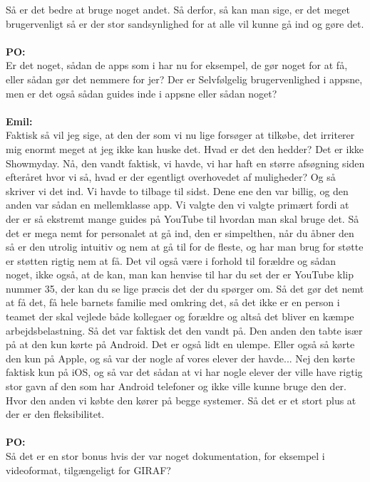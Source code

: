 Så er det bedre at bruge noget andet.
Så derfor, så kan man sige, er det meget brugervenligt så er der stor sandsynlighed for at alle vil kunne gå ind og gøre det.
\\\\
\textbf{PO:}\\
Er det noget, sådan de apps som i har nu for eksempel, de gør noget for at få, eller sådan gør det nemmere for jer?
Der er Selvfølgelig brugervenlighed i appsne, men er det også sådan guides inde i appsne eller sådan noget?
\\\\
\textbf{Emil:} \\
Faktisk så vil jeg sige, at den der som vi nu lige forsøger at tilkøbe, det irriterer mig enormt meget at jeg ikke kan huske det.
Hvad er det den hedder?
Det er ikke Showmyday.
Nå, den vandt faktisk, vi havde, vi har haft en større afsøgning siden efteråret hvor vi så, hvad er der egentligt overhovedet af muligheder?
Og så skriver vi det ind.
Vi havde to tilbage til sidst. 
Dene ene den var billig, og den anden var sådan en mellemklasse app.
Vi valgte den vi valgte primært fordi at der er så ekstremt mange guides på YouTube til hvordan man skal bruge det.
Så det er mega nemt for personalet at gå ind, den er simpelthen, når du åbner den så er den utrolig intuitiv og nem at gå til for de fleste, og har man brug for støtte er støtten rigtig nem at få.
Det vil også være i forhold til forældre og sådan noget, ikke også, at de kan, man kan henvise til har du set der er YouTube klip nummer 35, der kan du se lige præcis det der du spørger om.
Så det gør det nemt at få det, få hele barnets familie med omkring det, så det ikke er en person i teamet der skal vejlede både kollegaer og forældre og altså det bliver en kæmpe arbejdsbelastning.
Så det var faktisk det den vandt på. 
Den anden den tabte især på at den kun kørte på Android. 
Det er også lidt en ulempe. 
Eller også så kørte den kun på Apple, og så var der nogle af vores elever der havde... 
Nej den kørte faktisk kun på iOS, og så var det sådan at vi har nogle elever der ville have rigtig stor gavn af den som har Android telefoner og ikke ville kunne bruge den der.
Hvor den anden vi købte den kører på begge systemer.
Så det er et stort plus at der er den fleksibilitet. 
\\\\
\textbf{PO:}\\
Så det er en stor bonus hvis der var noget dokumentation, for eksempel i videoformat, tilgængeligt for GIRAF?
\\\\
